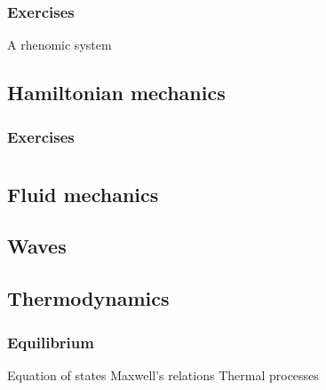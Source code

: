 \documentclass{../note}
\begin{document}
\section*{Exercises}
\begin{prb}[Brachiostochrone]
\end{prb}
\begin{prb}
\end{prb}
\begin{prb}
\end{prb}
\begin{prb}
A rhenomic system
\end{prb}
\begin{prb}
\end{prb}
\begin{prb}
\end{prb}


\chapter{Hamiltonian mechanics}

\section*{Exercises}






\part{}


\chapter{Fluid mechanics}

\chapter{Waves}

\chapter{Thermodynamics}
\section{Equilibrium}
Equation of states
Maxwell's relations
Thermal processes
\end{document}
